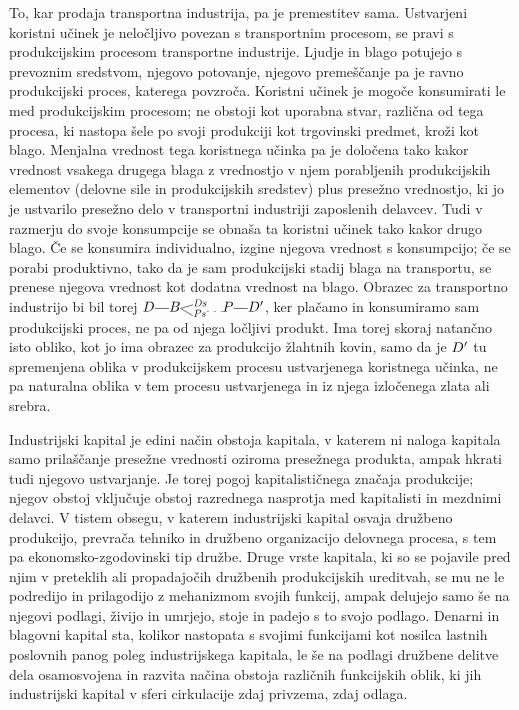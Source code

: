\documentclass[kapital_02.tex]{subfiles}
\begin{document}
To, kar prodaja transportna industrija, pa je premestitev sama. Ustvarjeni koristni učinek je neločljivo povezan s transportnim procesom, se pravi s produkcijskim procesom transportne industrije. Ljudje in blago potujejo s prevoznim sredstvom, njegovo potovanje, njegovo premeščanje pa je ravno produkcijski proces, katerega povzroča. Koristni učinek je mogoče konsumirati le med produkcijskim procesom; ne obstoji kot uporabna stvar, različna od tega procesa, ki nastopa šele po svoji produkciji kot trgovinski predmet, kroži kot blago. Menjalna vrednost tega koristnega učinka pa je določena tako kakor vrednost vsakega drugega blaga z vrednostjo v njem porabljenih produkcijskih elementov (delovne sile in produkcijskih sredstev) plus presežno vrednostjo, ki jo je ustvarilo presežno delo v transportni industriji zaposlenih delavcev. Tudi v razmerju do svoje konsumpcije se obnaša ta koristni učinek tako kakor drugo blago. Če se konsumira individualno, izgine njegova vrednost s konsumpcijo; če se porabi produktivno, tako da je sam produkcijski stadij blaga na transportu, se prenese njegova vrednost kot dodatna vrednost na blago. Obrazec za transportno industrijo bi bil torej \(\KPED\KPEcrta\KPEBrazcepDsPs\KPEpike\KPEP\KPEcrta\KPED'\), ker plačamo in konsumiramo sam produkcijski proces, ne pa od njega ločljivi produkt. Ima torej skoraj natančno isto obliko, kot jo ima obrazec za produkcijo žlahtnih kovin, samo da je \(D'\) tu spremenjena oblika v produkcijskem procesu ustvarjenega koristnega učinka, ne pa naturalna oblika v tem procesu ustvarjenega in iz njega izločenega zlata ali srebra.

Industrijski kapital je edini način obstoja kapitala, v katerem ni naloga kapitala samo prilaščanje presežne vrednosti oziroma presežnega produkta, ampak hkrati tudi njegovo ustvarjanje. Je torej pogoj kapitalističnega značaja produkcije; njegov obstoj vključuje obstoj razrednega nasprotja med kapitalisti in mezdnimi delavci. V tistem obsegu, v katerem industrijski kapital osvaja družbeno produkcijo, prevrača tehniko in družbeno organizacijo delovnega procesa, s tem pa ekonomsko-zgodovinski tip družbe. Druge vrste kapitala, ki so se pojavile pred njim v preteklih ali propadajočih družbenih produkcijskih ureditvah, se mu ne le podredijo in prilagodijo z mehanizmom svojih funkcij, ampak delujejo samo še na njegovi podlagi, živijo in umrjejo, stoje in padejo s to svojo podlago. Denarni in blagovni kapital sta, kolikor nastopata s svojimi funkcijami kot nosilca lastnih poslovnih panog poleg industrijskega kapitala, le še na podlagi družbene delitve dela osamosvojena in razvita načina obstoja različnih funkcijskih oblik, ki jih industrijski kapital v sferi cirkulacije zdaj privzema, zdaj odlaga.
\end{document}
